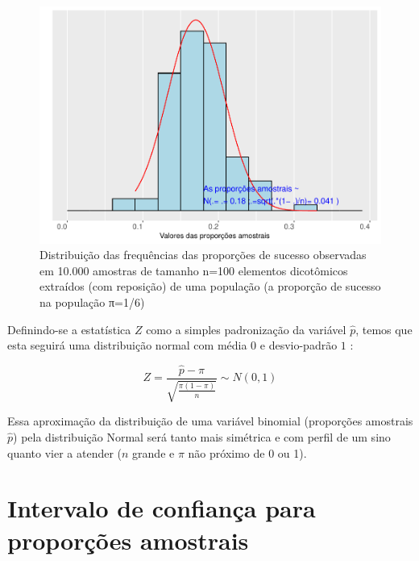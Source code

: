 \documentclass[
]{book}
\begin{document}
\begin{figure}

{\centering \includegraphics[width=1\linewidth]{apostila_files/figure-latex/fig66-1} 

}

\caption{Distribuição das frequências das proporções de sucesso observadas em 10.000 amostras de tamanho n=100 elementos dicotômicos extraídos (com reposição) de uma população 
(a proporção de sucesso na população π=1/6)}\label{fig:fig66}
\end{figure}

\hfill\break

Definindo-se a estatística \(Z\) como a simples padronização da variável \(\hat{p}\), temos que esta seguirá uma distribuição normal com média \(0\) e desvio-padrão \(1\) :

\hfill\break

\[
Z=\frac{\hat{p}-\pi }{\sqrt{\frac{\pi \left(1-\pi \right)}{n}}} \sim N\left(0,1\right)
\]

\hfill\break

Essa aproximação da distribuição de uma variável binomial (proporções amostrais \(\hat{p}\)) pela distribuição Normal será tanto mais simétrica e com perfil de um sino quanto vier a atender (\(n\) grande e \(\pi\) não próximo de 0 ou 1).

\hfill\break

\hypertarget{intervalo-de-confianuxe7a-para-proporuxe7uxf5es-amostrais}{%
\section{Intervalo de confiança para proporções amostrais}\label{intervalo-de-confianuxe7a-para-proporuxe7uxf5es-amostrais}}
\end{document}
